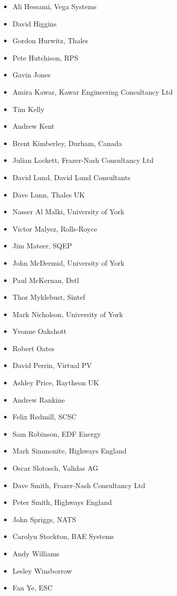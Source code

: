 \begin{itemize}
  \item Ali Hessami, Vega Systems
  \item David Higgins
  \item Gordon Hurwitz, Thales
  \item Pete Hutchison, RPS
  \item Gavin Jones
  \item Amira Kawar, Kawar Engineering Consultancy Ltd
  \item Tim Kelly
  \item Andrew Kent
  \item Brent Kimberley, Durham, Canada
  \item Julian Lockett, Frazer-Nash Consultancy Ltd
  \item David Lund, David Lund Consultants
  \item Dave Lunn, Thales UK
  \item Nasser Al Malki, University of York
  \item Victor Malysz, Rolls-Royce
  \item Jim Mateer, SQEP
  \item John McDermid, University of York
  \item Paul McKernan, Dstl
  \item Thor Myklebust, Sintef
  \item Mark Nicholson, University of York
  \item Yvonne Oakshott
  \item Robert Oates
  \item David Perrin, Virtual PV
  \item Ashley Price, Raytheon UK
  \item Andrew Rankine
  \item Felix Redmill, SCSC
  \item Sam Robinson, EDF Energy
  \item Mark Simmonite, Highways England
  \item Oscar Slotosch, Validas AG
  \item Dave Smith, Frazer-Nash Consultancy Ltd
  \item Peter Smith, Highways England
  \item John Spriggs, NATS
  \item Carolyn Stockton, BAE Systems
  \item Andy Williams
  \item Lesley Winsborrow
  \item Fan Ye, ESC
\end{itemize}
